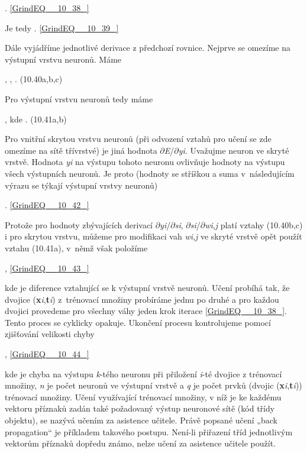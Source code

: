 . \eqref{GrindEQ__10_38_}

\noindent Je tedy  . \eqref{GrindEQ__10_39_}

\noindent Dále vyjádříme jednotlivé derivace z předchozí rovnice. Nejprve se omezíme na výstupní vrstvu neuronů. Máme

 ,     ,     . (10.40a,b,c)

\noindent Pro výstupní vrstvu neuronů tedy máme

 ,   kde   . (10.41a,b)

\noindent Pro vnitřní skrytou vrstvu neuronů (při odvození vztahů pro učení se zde omezíme na sítě třívrstvé) je jiná hodnota $\partial$\textit{E}/$\partial$\textit{yi}. Uvažujme neuron ve skryté vrstvě. Hodnota \textit{yi} na výstupu tohoto neuronu ovlivňuje hodnoty na výstupu všech výstupních neuronů. Je proto (hodnoty se stříškou a suma v~následujícím výrazu se týkají výstupní vrstvy neuronů)

 . \eqref{GrindEQ__10_42_}

\noindent Protože pro hodnoty zbývajících derivací $\partial$\textit{yi}/$\partial$\textit{si}, $\partial$\textit{si}/$\partial$\textit{wi},\textit{j} platí vztahy (10.40b,c) i pro skrytou vrstvu, můžeme pro modifikaci vah \textit{wi},\textit{j} ve skryté vrstvě opět použít vztahu (10.41a), v~němž však položíme

 , \eqref{GrindEQ__10_43_}

\noindent kde  je diference vztahující se k výstupní vrstvě neuronů. Učení probíhá tak, že dvojice (\textbf{x}\textit{i},\textbf{t}\textit{i}) z~trénovací množiny probíráme jednu po druhé a pro každou dvojici provedeme pro všechny váhy jeden krok iterace \eqref{GrindEQ__10_38_}. Tento proces se cyklicky opakuje. Ukončení procesu kontrolujeme pomocí zjišťování velikosti chyby

 , \eqref{GrindEQ__10_44_}

\noindent kde  je chyba na výstupu \textit{k}-tého neuronu při přiložení \textit{i}-té dvojice z trénovací množiny, \textit{n} je počet neuronů ve výstupní vrstvě a \textit{q} je počet prvků (dvojic (\textbf{x}\textit{i},\textbf{t}\textit{i})) trénovací množiny. Učení využívající trénovací množiny, v níž je ke každému vektoru příznaků zadán také požadovaný výstup neuronové sítě (kód třídy objektu), se nazývá učením za asistence učitele. Právě popsané učení „back propagation`` je příkladem takového postupu. Není-li přiřazení tříd jednotlivým vektorům příznaků dopředu známo, nelze učení za asistence učitele použít. 

